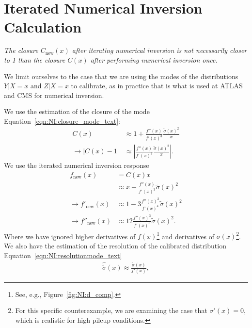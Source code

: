 \section{Iterated Numerical Inversion Calculation}
\label{sec:NI:iterated}
{\it The closure $C_\text{new}(x)$ after iterating numerical inversion is not necessarily closer to 1 than the closure $C(x)$ after performing numerical inversion once.}

\vspace{5mm}

We limit ourselves to the case that we are using the modes of the distributions $Y|X=x$ and $Z|X=x$ to calibrate, as in practice that is what is used at ATLAS and CMS for numerical inversion.

We use the estimation of the closure of the mode Equation~\ref{eqn:NI:closure_mode_text}:
\begin{align}
C(x) &\approx 1+\frac{f''(x)}{f'(x)^3}\frac{\tilde{\sigma}(x)^2}{x}\nonumber\\
\rightarrow |C(x)-1|&\approx \left|\frac{f''(x)}{f'(x)^3}\frac{\tilde{\sigma}(x)^2}{x}\right|.
\end{align}
We use the iterated numerical inversion response
\begin{align}
f_{\text{new}}(x) &= C(x)x\nonumber\\
&\approx x+\frac{f''(x)}{f'(x)^3}\tilde{\sigma}(x)^2\\
\rightarrow f'_{\text{new}}(x) &\approx 1-3\frac{f''(x)^2}{f'(x)^4}\tilde{\sigma}(x)^2\\
\rightarrow f''_{\text{new}}(x) &\approx 12\frac{f''(x)^3}{f'(x)^5}\tilde{\sigma}(x)^2.
\end{align}
Where we have ignored higher derivatives of $f(x)$\footnote{See, e.g., Figure~\ref{fig:NI:d_comp}.} and derivatives of $\sigma(x)$\footnote{For this specific counterexample, we are examining the case that $\sigma'(x)=0$, which is realistic for high pileup conditions.}.  We also have the estimation of the resolution of the calibrated distribution Equation~\ref{eqn:NI:resolutionmode_text}
\begin{align}
\hat{\tilde{\sigma}}(x) \approx \frac{\tilde{\sigma}(x)}{f'(x)},
\end{align}

